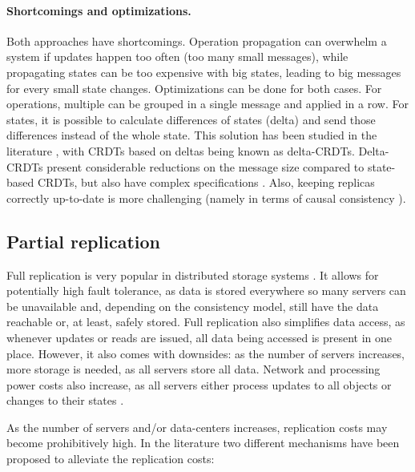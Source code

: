 \paragraph{Shortcomings and optimizations.}
Both approaches have shortcomings.
Operation propagation can overwhelm a system if updates happen too often (too many small messages), while propagating states can be too expensive with big states, leading to big messages for every small state changes.
Optimizations can be done for both cases.
For operations, multiple can be grouped in a single message and applied in a row.
For states, it is possible to calculate differences of states (delta) and send those differences instead of the whole state.
This solution has been studied in the literature \cite{deltaAlmeida, deltaVan}, with CRDTs based on deltas being known as delta-CRDTs. Delta-CRDTs present considerable reductions on the message size compared to state-based CRDTs, but also have complex specifications \cite{deltaAlmeida}. Also, keeping replicas correctly up-to-date is more challenging (namely in terms of causal consistency \cite{deltaAlmeida}).

\subsection{Partial replication}

Full replication is very popular in distributed storage systems \cite{sipre}. 
It allows for potentially high fault tolerance, as data is stored everywhere so many servers can be unavailable and, depending on the consistency model, still have the data reachable or, at least, safely stored.
Full replication also simplifies data access, as whenever updates or reads are issued, all data being accessed is present in one place.
However, it also comes with downsides: as the number of servers increases, more storage is needed, as all servers store all data.
Network and processing power costs also increase, as all servers either process updates to all objects or changes to their states \cite{sipre}.

As the number of servers and/or data-centers increases, replication costs may become prohibitively high.
In the literature two different mechanisms have been proposed to alleviate the replication costs:

